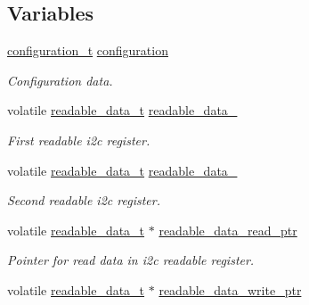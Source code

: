 \subsection*{Variables}
\begin{DoxyCompactItemize}
\item 
\mbox{\label{i2c-th_8h_a32c97d3f8cd6089ccf54e7c423020b7a}} 
\hyperlink{structconfiguration__t}{configuration\+\_\+t} \hyperlink{i2c-th_8h_a32c97d3f8cd6089ccf54e7c423020b7a}{configuration}
\begin{DoxyCompactList}\small\item\em Configuration data. \end{DoxyCompactList}\item 
\mbox{\label{i2c-th_8h_ab7c4666cc43ac73859ace91030494dba}} 
volatile \hyperlink{structreadable__data__t}{readable\+\_\+data\+\_\+t} \hyperlink{i2c-th_8h_ab7c4666cc43ac73859ace91030494dba}{readable\+\_\+data\+\_}
\begin{DoxyCompactList}\small\item\em First readable i2c register. \end{DoxyCompactList}\item 
\mbox{\label{i2c-th_8h_af1fd929e13557159958a5328deefd8a3}} 
volatile \hyperlink{structreadable__data__t}{readable\+\_\+data\+\_\+t} \hyperlink{i2c-th_8h_af1fd929e13557159958a5328deefd8a3}{readable\+\_\+data\+\_}
\begin{DoxyCompactList}\small\item\em Second readable i2c register. \end{DoxyCompactList}\item 
\mbox{\label{i2c-th_8h_af0914001a8977841586be8312dee3656}} 
volatile \hyperlink{structreadable__data__t}{readable\+\_\+data\+\_\+t} $\ast$ \hyperlink{i2c-th_8h_af0914001a8977841586be8312dee3656}{readable\+\_\+data\+\_\+read\+\_\+ptr}
\begin{DoxyCompactList}\small\item\em Pointer for read data in i2c readable register. \end{DoxyCompactList}\item 
\mbox{\label{i2c-th_8h_ab7eec4069b1ac3d682d74b37921e2707}} 
volatile \hyperlink{structreadable__data__t}{readable\+\_\+data\+\_\+t} $\ast$ \hyperlink{i2c-th_8h_ab7eec4069b1ac3d682d74b37921e2707}{readable\+\_\+data\+\_\+write\+\_\+ptr}

\end{DoxyCompactItemize}
